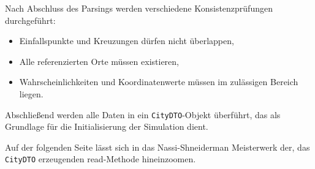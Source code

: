 \clearpage

Nach Abschluss des Parsings werden verschiedene Konsistenzprüfungen durchgeführt:
\begin{itemize}
  \item Einfallspunkte und Kreuzungen dürfen nicht überlappen,
  \item Alle referenzierten Orte müssen existieren,
  \item Wahrscheinlichkeiten und Koordinatenwerte müssen im zulässigen Bereich liegen.
\end{itemize}

Abschließend werden alle Daten in ein \texttt{CityDTO}-Objekt überführt,
das als Grundlage für die Initialisierung der Simulation dient.

Auf der folgenden Seite lässt sich in das Nassi-Shneiderman Meisterwerk der, das \texttt{CityDTO} erzeugenden read-Methode hineinzoomen.
\clearpage
\FloatBarrier
\begin{figure}[h!]
    \vspace{-1.5cm} 
    \centering
\end{figure}
\clearpage
